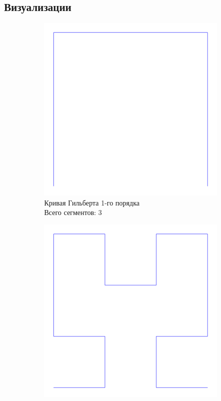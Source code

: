 \subsection{Визуализации}

\begin{figure}[H]
    \captionsetup[subfigure]{labelformat=empty, justification=centering}
    \centering
    \begin{subfigure}{0.42\textwidth}
        \includegraphics[width=\textwidth]{plots/hilbert_curve_level1.png}
        \caption{Кривая Гильберта 1-го порядка \\ Всего сегментов: 3}
    \end{subfigure}
    \hfill
    \begin{subfigure}{0.42\textwidth}
        \includegraphics[width=\textwidth]{plots/hilbert_curve_level2.png}

\end{subfigure}
\end{figure}
